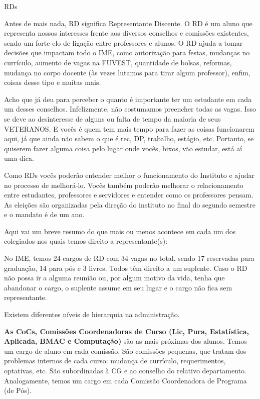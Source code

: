 \begin{subsecao}{RDs}

Antes de mais nada, RD significa Representante Discente. O RD é um aluno que
representa nossos interesses frente aos diversos conselhos e comissões
existentes, sendo um forte elo de ligação entre professores e alunos. O RD
ajuda a tomar decisões que impactam todo o IME, como autorização para festas,
mudanças no currículo, aumento de vagas na FUVEST, quantidade de bolsas,
reformas, mudança no corpo docente (às vezes lutamos para tirar algum
professor), enfim, coisas desse tipo e muitas mais.

Acho que já deu para perceber o quanto é importante ter um estudante em cada um
desses conselhos. Infelizmente, não costumamos preencher todas as vagas. Isso se
deve ao desinteresse de alguns ou falta de tempo da maioria de seus VETERANOS.
E vocês é quem tem mais tempo para fazer as coisas funcionarem aqui, já que
ainda não sabem o que é rec, DP, trabalho, estágio, etc. Portanto, se quiserem
fazer alguma coisa pelo lugar onde vocês, bixos, vão estudar, está aí
uma dica.

Como RDs vocês poderão entender melhor o funcionamento do Instituto e ajudar no
processo de melhorá-lo. Vocês também poderão melhorar o relacionamento entre
estudantes, professores e servidores e entender como os professores pensam.
As eleições são organizadas pela direção do instituto no final do segundo
semestre e o mandato é de um ano.

Aqui vai um breve resumo do que mais ou menos acontece em cada um dos colegiados
nos quais temos direito a representante(s):

No IME, temos 24 cargos de RD com 34 vagas no total, sendo 17 reservadas
para graduação, 14 para pós e 3 livres. Todos têm direito a um suplente.
Caso o RD não possa ir a alguma reunião ou, por algum motivo da vida, tenha
que abandonar o cargo, o suplente assume em seu lugar e o cargo não fica
sem representante.

Existem diferentes níveis de hierarquia na administração.

{\bf As CoCs,
Comissões Coordenadoras de Curso (Lic, Pura, Estatística, Aplicada, BMAC e
Computação)} são as mais próximas dos alunos. Temos um cargo de aluno em cada
comissão. São comissões pequenas, que tratam dos problemas internos de cada
curso: mudança de currículo, requerimentos, optativas, etc. São subordinadas
à CG e ao conselho do relativo departamento. Analogamente, temos um cargo em cada
Comissão Coordenadora de Programa (de Pós).


\end{subsecao}
